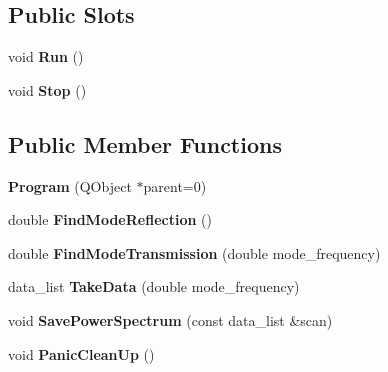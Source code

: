 \subsection*{Public Slots}
\begin{DoxyCompactItemize}
\item 
void {\bfseries Run} ()\hypertarget{classetig_1_1_program_a15392fd26830cb264cff92092a48c874}{}\label{classetig_1_1_program_a15392fd26830cb264cff92092a48c874}

\item 
void {\bfseries Stop} ()\hypertarget{classetig_1_1_program_a5d144652844118b17dd8e591415365ac}{}\label{classetig_1_1_program_a5d144652844118b17dd8e591415365ac}

\end{DoxyCompactItemize}
\subsection*{Public Member Functions}
\begin{DoxyCompactItemize}
\item 
{\bfseries Program} (Q\+Object $\ast$parent=0)\hypertarget{classetig_1_1_program_a8c31dffc20c4394929dd300ac92972d7}{}\label{classetig_1_1_program_a8c31dffc20c4394929dd300ac92972d7}

\item 
double {\bfseries Find\+Mode\+Reflection} ()\hypertarget{classetig_1_1_program_a1299fec5e80b7d7eb1ca0cda7eb3119b}{}\label{classetig_1_1_program_a1299fec5e80b7d7eb1ca0cda7eb3119b}

\item 
double {\bfseries Find\+Mode\+Transmission} (double mode\+\_\+frequency)\hypertarget{classetig_1_1_program_ae5bc8e04ddd5ed957e1ace2f2bc3d5d9}{}\label{classetig_1_1_program_ae5bc8e04ddd5ed957e1ace2f2bc3d5d9}

\item 
data\+\_\+list {\bfseries Take\+Data} (double mode\+\_\+frequency)\hypertarget{classetig_1_1_program_ac01f0ba930b0bb450905c1377decfffa}{}\label{classetig_1_1_program_ac01f0ba930b0bb450905c1377decfffa}

\item 
void {\bfseries Save\+Power\+Spectrum} (const data\+\_\+list \&scan)\hypertarget{classetig_1_1_program_ab0cf10316e239d8c64299b70b4c383dd}{}\label{classetig_1_1_program_ab0cf10316e239d8c64299b70b4c383dd}

\item 
void {\bfseries Panic\+Clean\+Up} ()\hypertarget{classetig_1_1_program_af6162f08814e2c7e751fd0c3e9d986cb}{}\label{classetig_1_1_program_af6162f08814e2c7e751fd0c3e9d986cb}

\end{DoxyCompactItemize}

